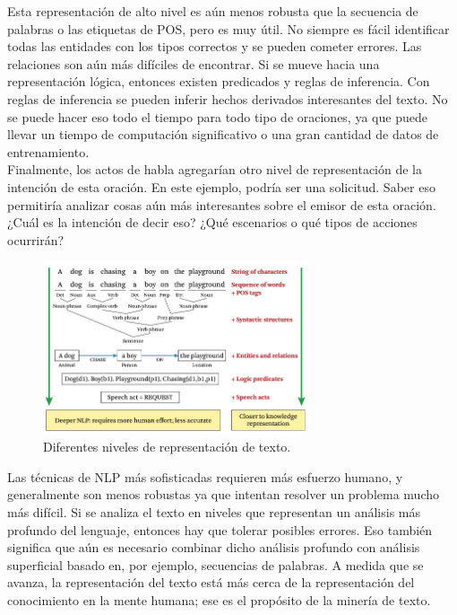Esta representación de alto nivel es aún menos robusta que la secuencia de palabras o las etiquetas de POS, pero es muy útil. No siempre es fácil identificar todas las entidades con los tipos correctos y se pueden cometer errores. Las relaciones son aún más difíciles de encontrar. Si se mueve hacia una representación lógica, entonces existen predicados y reglas de inferencia. Con reglas de inferencia se pueden inferir hechos derivados interesantes del texto. No se puede hacer eso todo el tiempo para todo tipo de oraciones, ya que puede llevar un tiempo de computación significativo o una gran cantidad de datos de entrenamiento. \\

Finalmente, los actos de habla agregarían otro nivel de representación de la intención de esta oración. En este ejemplo, podría ser una solicitud. Saber eso permitiría analizar cosas aún más interesantes sobre el emisor de esta oración. ¿Cuál es la intención de decir eso? ¿Qué escenarios o qué tipos de acciones ocurrirán?

\begin{figure}[h]
\centering
\includegraphics[width=0.7\textwidth]{fotos/5.png}
\caption{Diferentes niveles de representación de texto.}
\label{fig:3.3}
\end{figure}

Las técnicas de NLP más sofisticadas requieren más esfuerzo humano, y generalmente son menos robustas ya que intentan resolver un problema mucho más difícil. Si se analiza el texto en niveles que representan un análisis más profundo del lenguaje, entonces hay que tolerar posibles errores. Eso también significa que aún es necesario combinar dicho análisis profundo con análisis superficial basado en, por ejemplo, secuencias de palabras. A medida que se avanza, la representación del texto está más cerca de la representación del conocimiento en la mente humana; ese es el propósito de la minería de texto. \\

